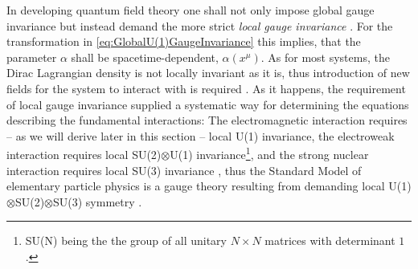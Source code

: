 \documentclass[../main.tex]{subfiles} %
\begin{document}
In developing quantum field theory one shall not only impose global gauge invariance but instead demand the more strict \emph{local gauge invariance} \cite{griffiths_introToElementaryParticles_2008}. For the transformation in \cref{eq:GlobalU(1)GaugeInvariance} this implies, that the parameter $\alpha$ shall be spacetime-dependent, $\alpha(x^\mu)$. As for most systems, the Dirac Lagrangian density is not locally invariant as it is, thus introduction of new fields for the system to interact with is required \cite{panyella_masterThesis_2019}. As it happens, the requirement of local gauge invariance supplied a systematic way for determining the equations describing the fundamental interactions: The electromagnetic interaction requires -- as we will derive later in this section -- local U(1) invariance, the electroweak interaction requires local SU(2)$\otimes$U(1) invariance\footnote{SU(N) being the the group of all unitary $N \times N$ matrices with determinant $1$ \cite{peskin_introToQFT_1995}.}, and the strong nuclear interaction requires local SU(3) invariance \cite{stanford_QFT, griffiths_introToElementaryParticles_2008}, thus the Standard Model of elementary particle physics is a gauge theory resulting from demanding local U(1)$\otimes$SU(2)$\otimes$SU(3) symmetry \cite{stanford_historyOfQFT}.
\end{document}
